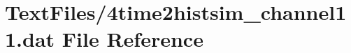 \hypertarget{4time2histsim__channel11_8dat}{}\section{Text\+Files/4time2histsim\+\_\+channel11.dat File Reference}
\label{4time2histsim__channel11_8dat}

